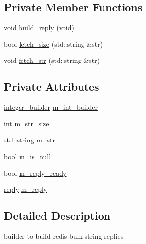 \subsection*{Private Member Functions}
\begin{DoxyCompactItemize}
\item 
void \hyperlink{classcpp__redis_1_1builders_1_1bulk__string__builder_a9f3622a786d17cded1bcdb99c5c3ec72}{build\+\_\+reply} (void)
\item 
bool \hyperlink{classcpp__redis_1_1builders_1_1bulk__string__builder_a5bfc13e5c3a03b73e0c0700143075797}{fetch\+\_\+size} (std\+::string \&str)
\item 
void \hyperlink{classcpp__redis_1_1builders_1_1bulk__string__builder_a0ab6e537f621fd8df0d70663920eddc7}{fetch\+\_\+str} (std\+::string \&str)
\end{DoxyCompactItemize}
\subsection*{Private Attributes}
\begin{DoxyCompactItemize}
\item 
\hyperlink{classcpp__redis_1_1builders_1_1integer__builder}{integer\+\_\+builder} \hyperlink{classcpp__redis_1_1builders_1_1bulk__string__builder_a915d9ed7510d3da74acfba316bb6552a}{m\+\_\+int\+\_\+builder}
\item 
int \hyperlink{classcpp__redis_1_1builders_1_1bulk__string__builder_afac58a56edceb0ed8b5581fc53907f58}{m\+\_\+str\+\_\+size}
\item 
std\+::string \hyperlink{classcpp__redis_1_1builders_1_1bulk__string__builder_a98a8ab86c8a6d9e6918389ca894853d3}{m\+\_\+str}
\item 
bool \hyperlink{classcpp__redis_1_1builders_1_1bulk__string__builder_af55ddd50b4d654eb41a153c77ebca8c0}{m\+\_\+is\+\_\+null}
\item 
bool \hyperlink{classcpp__redis_1_1builders_1_1bulk__string__builder_a98dfcef106c6e96e920da82773fcfb85}{m\+\_\+reply\+\_\+ready}
\item 
\hyperlink{classcpp__redis_1_1reply}{reply} \hyperlink{classcpp__redis_1_1builders_1_1bulk__string__builder_af83fb520f2a964124a95e6ba1d87c651}{m\+\_\+reply}
\end{DoxyCompactItemize}


\subsection{Detailed Description}
builder to build redis bulk string replies 


